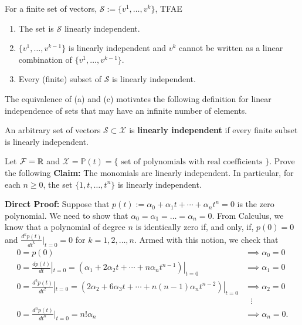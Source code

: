 \begin{claim} For a finite set of vectors, $\mathcal{S}:=\{v^1, \dots, v^k\}$, TFAE
\begin{enumerate}
        \renewcommand{\labelenumi}{(\alph{enumi})}
        \setlength{\itemsep}{.1cm}
    \item The set is $\mathcal{S}$ linearly independent.  
    \item $\{v^1, \dots, v^{k-1}\}$ is linearly independent and $v^k$ cannot be written as a linear combination of $\{v^1, \dots, v^{k-1}\}$.
    \item Every (finite) subset of $\mathcal{S}$ is linearly independent.
\end{enumerate}
\end{claim}
\vspace*{.2cm}
The equivalence of (a) and (c) motivates the following definition for linear independence of sets that may have an infinite number of elements.\\

\begin{definition}An arbitrary set of vectors $\mathcal{S}\subset\mathcal{X}$ is \textbf{linearly independent} if every finite subset is linearly independent.
\end{definition}


\begin{example} 
Let $\mathcal{F}=\mathbb R$ and $\mathcal{X}=\mathbb{P}(t)=\{ \text{ set of polynomials with real coefficients } \}$. Prove the following \textbf{Claim:} The monomials are linearly independent. In particular, for each $n\geq 0$, the set $\{1,t,\dots,t^n\}$ is linearly independent.
\end{example}

\textbf{Direct Proof:} Suppose that $p(t):=\alpha_0+\alpha_1 t+\cdots+\alpha_n t^n=0$ is the zero polynomial. We need to show that $\alpha_0=\alpha_1=\dots=\alpha_n=0$. 
From Calculus, we know that a polynomial of degree $n$ is identically zero if, and only, if,  $p(0)= 0$ and $\frac{d^kp(t)}{dt^k}|_{t=0}=0$ for $k=1,2,\ldots, n$. Armed with this notion, we check that
\begin{align*}
0=p(0) & \implies \alpha_0=0 \\
0=\frac{dp(t)}{dt}|_{t=0}=(\alpha_1+2\alpha_2t+\cdots+n\alpha_nt^{n-1})|_{t=0} & \implies \alpha_1=0\\
0=\frac{d^2p(t)}{dt^2}|_{t=0}=(2\alpha_2 + 6 \alpha_3 t + \cdots+n (n-1)\alpha_nt^{n-2})|_{t=0} & \implies \alpha_2=0\\
& ~~~\vdots \\
0 = \frac{d^np(t)}{dt^n}|_{t=0}= n! \alpha_n & \implies \alpha_n = 0.
\end{align*}

